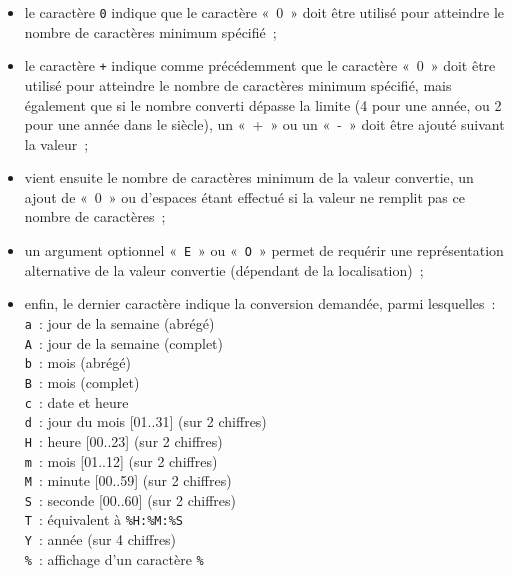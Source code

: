 \documentclass [twoside] {report}
\begin{document}
\begin {itemize}
    \item le caractère \texttt {0} indique que le caractère «~0~»
	doit être utilisé pour atteindre le nombre de caractères
	minimum spécifié~;

    \item le caractère \texttt {+} indique comme précédemment que
	le caractère «~0~» doit être utilisé pour atteindre le
	nombre de caractères minimum spécifié, mais également que
	si le nombre converti dépasse la limite (4 pour une année,
	ou 2 pour une année dans le siècle), un «~+~» ou un «~-~»
	doit être ajouté suivant la valeur~;

    \item vient ensuite le nombre de caractères minimum de la valeur
	convertie, un ajout de «~0~» ou d'espaces étant effectué si
	la valeur ne remplit pas ce nombre de caractères~;

    \item un argument optionnel «~\texttt {E}~» ou «~\texttt {O}~»
	permet de requérir une représentation alternative de la valeur
	convertie (dépendant de la localisation)~;

    \item enfin, le dernier caractère indique la conversion demandée,
	parmi lesquelles~: \\
	\texttt {a}~: jour de la semaine (abrégé) \\
	\texttt {A}~: jour de la semaine (complet) \\
	\texttt {b}~: mois (abrégé) \\
	\texttt {B}~: mois (complet) \\
	\texttt {c}~: date et heure \\
	\texttt {d}~: jour du mois [01..31] (sur 2 chiffres) \\
	\texttt {H}~: heure [00..23] (sur 2 chiffres) \\
	\texttt {m}~: mois [01..12] (sur 2 chiffres) \\
	\texttt {M}~: minute [00..59] (sur 2 chiffres) \\
	\texttt {S}~: seconde [00..60] (sur 2 chiffres) \\
	\texttt {T}~: équivalent à \verb|%H:%M:%S| \\
	\texttt {Y}~: année (sur 4 chiffres) \\
	\texttt {\%}~: affichage d'un caractère \texttt {\%}

\end {itemize}
\end{document}
